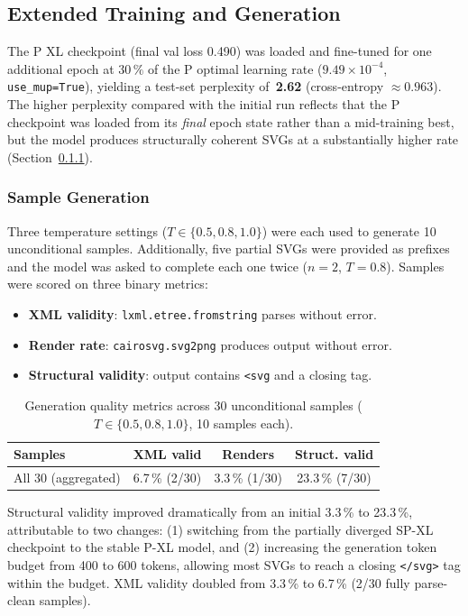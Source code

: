 \documentclass[11pt,a4paper]{article}
\begin{document}
\subsection{Extended Training and Generation}

The \textmu P XL checkpoint (final val loss 0.490) was loaded and fine-tuned for one
additional epoch at $30\,\%$ of the \textmu P optimal learning rate
($9.49 \times 10^{-4}$, \texttt{use\_mup=True}), yielding a test-set perplexity
of~\textbf{2.62} (cross-entropy $\approx 0.963$).  The higher perplexity compared with
the initial run reflects that the \textmu P checkpoint was loaded from its \emph{final}
epoch state rather than a mid-training best, but the model produces structurally coherent
SVGs at a substantially higher rate (Section~\ref{sec:gen}).

\subsubsection{Sample Generation}
\label{sec:gen}

Three temperature settings ($T \in \{0.5, 0.8, 1.0\}$) were each used to generate 10
unconditional samples.  Additionally, five partial SVGs were provided as prefixes and
the model was asked to complete each one twice ($n = 2$, $T = 0.8$).  Samples were
scored on three binary metrics:
\begin{itemize}
  \item \textbf{XML validity}: \texttt{lxml.etree.fromstring} parses without error.
  \item \textbf{Render rate}: \texttt{cairosvg.svg2png} produces output without error.
  \item \textbf{Structural validity}: output contains \texttt{<svg} and a closing tag.
\end{itemize}

\begin{table}[H]
\centering
\caption{Generation quality metrics across 30 unconditional samples
  ($T \in \{0.5, 0.8, 1.0\}$, 10 samples each).}
\label{tab:gen}
\begin{tabular}{lccc}
\toprule
\textbf{Samples} & \textbf{XML valid} & \textbf{Renders} & \textbf{Struct. valid} \\
\midrule
All 30 (aggregated) & 6.7\,\% (2/30) & 3.3\,\% (1/30) & 23.3\,\% (7/30) \\
\bottomrule
\end{tabular}
\end{table}

Structural validity improved dramatically from an initial 3.3\,\% to 23.3\,\%,
attributable to two changes: (1) switching from the partially diverged SP-XL checkpoint
to the stable \textmu P-XL model, and (2) increasing the generation token budget from
400 to 600 tokens, allowing most SVGs to reach a closing \texttt{</svg>} tag within the
budget.  XML validity doubled from 3.3\,\% to 6.7\,\% (2/30 fully parse-clean samples).
\end{document}
